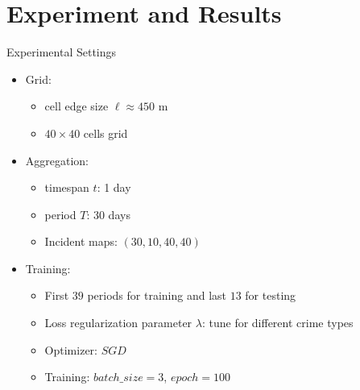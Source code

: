 \documentclass[10pt]{beamer}
\begin{document}
\section{Experiment and Results}

\begin{frame}{Experimental Settings}
\begin{itemize}
    \item Grid: 
    \begin{itemize}
        \item cell edge size $\ell\approx 450$ m
        \item $40 \times 40$ cells grid
    \end{itemize}
    \item Aggregation:
    \begin{itemize}
        \item timespan $t$: 1 day
        \item period $T$: 30 days
        \item Incident maps: $(30, 10, 40, 40)$
    \end{itemize}
    \item Training:
    \begin{itemize}
        \item First $39$ periods for training and last $13$ for testing
        \item Loss regularization parameter $\lambda$: tune for different crime types
        \item Optimizer: $SGD$
        \item Training: $batch\_size=3$, $epoch=100$
    \end{itemize}
\end{itemize}


\end{frame}

% 
\end{document}
